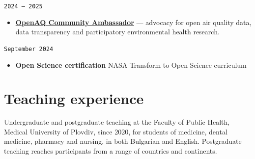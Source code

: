 \documentclass[
  10.5pt,
  a4paper,
  DIV=11,
  numbers=noendperiod]{scrartcl}
\providecommand{\tightlist}{%
  \setlength{\itemsep}{0pt}\setlength{\parskip}{0pt}}
\let\oldtexttt\texttt
\renewcommand{\texttt}[1]{{\color{cvbronze}\small\oldtexttt{#1}}}
\begin{document}
\texttt{2024\ –\ 2025}

\begin{itemize}
\tightlist
\item
  \textbf{\href{https://openaq.org/about/people/}{OpenAQ Community
  Ambassador}} --- advocacy for open air quality data, data transparency
  and participatory environmental health research.
\end{itemize}

\texttt{September\ 2024}

\begin{itemize}
\tightlist
\item
  \textbf{Open Science certification} \textbar{} NASA Transform to Open
  Science curriculum
\end{itemize}

\newpage{}

\section{Teaching experience}\label{teaching-experience}

Undergraduate and postgraduate teaching at the Faculty of Public Health,
Medical University of Plovdiv, since 2020, for students of medicine,
dental medicine, pharmacy and nursing, in both Bulgarian and English.
Postgraduate teaching reaches participants from a range of countries and
continents.
\end{document}
